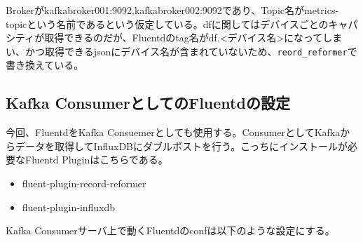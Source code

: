 Brokerがkafkabroker001:9092,kafkabroker002:9092であり、Topic名がmetrics-topicという名前であるという仮定している。dfに関してはデバイスごとのキャパシティが取得できるのだが、Fluentdのtag名がdf.<デバイス名>になってしまい、かつ取得できるjsonにデバイス名が含まれていないため、\verb|reord_reformer|で書き換えている。

\subsection{Kafka ConsumerとしてのFluentdの設定}
今回、FluentdをKafka Consuemerとしても使用する。ConsumerとしてKafkaからデータを取得してInfluxDBにダブルポストを行う。こっちにインストールが必要なFluentd Pluginはこちらである。

\begin{itemize}
	\item fluent-plugin-record-reformer
	\item fluent-plugin-influxdb
\end{itemize}

Kafka Consumerサーバ上で動くFluentdのconfは以下のような設定にする。

